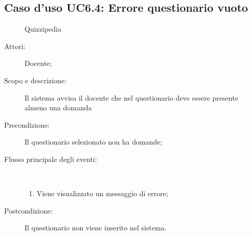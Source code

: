 \subsection{Caso d'uso UC6.4: Errore questionario vuoto}
	\begin{figure}[H]
		\centering
		\begin{resizedtikzpicture}{\textwidth}
		\begin{umlsystem}[x=0, fill=lightgray!20]{Quizzipedia}
		\end{umlsystem}
		\end{resizedtikzpicture}
		\caption{}
	\end{figure}
\begin{description}
\item[Attori:] Docente;
\item[Scopo e descrizione:] Il sistema avvisa il docente che nel questionario deve essere presente almeno una domanda
      \item[Precondizione:] Il questionario selezionato non ha domande;

        \item[Flusso principale degli eventi:] \ 
 \begin{enumerate}
          \item Viene visualizzato un messaggio di errore;

      \end{enumerate}
    \item[Postcondizione:] Il questionario non viene inserito nel sistema.
  \end{description}
\hypertarget{UC6.5}{}
